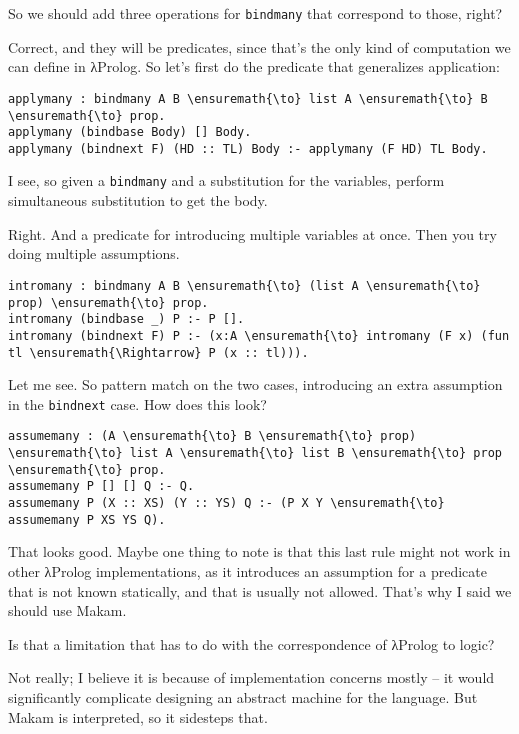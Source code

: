 \heroSTUDENT{} So we should add three operations for \texttt{bindmany} that
correspond to those, right?

\heroADVISOR{} Correct, and they will be predicates, since that's the only
kind of computation we can define in \foreignlanguage{greek}{λ}Prolog. So let's first do the
predicate that generalizes application:

\begin{verbatim}
applymany : bindmany A B \ensuremath{\to} list A \ensuremath{\to} B \ensuremath{\to} prop.
applymany (bindbase Body) [] Body.
applymany (bindnext F) (HD :: TL) Body :- applymany (F HD) TL Body.
\end{verbatim}

\heroSTUDENT{} I see, so given a \texttt{bindmany} and a substitution for the
variables, perform simultaneous substitution to get the body.

\heroADVISOR{} Right. And a predicate for introducing multiple variables at
once. Then you try doing multiple assumptions.

\begin{verbatim}
intromany : bindmany A B \ensuremath{\to} (list A \ensuremath{\to} prop) \ensuremath{\to} prop.
intromany (bindbase _) P :- P [].
intromany (bindnext F) P :- (x:A \ensuremath{\to} intromany (F x) (fun tl \ensuremath{\Rightarrow} P (x :: tl))).
\end{verbatim}

\heroSTUDENT{} Let me see. So pattern match on the two cases, introducing an
extra assumption in the \texttt{bindnext} case. How does this look?

\begin{verbatim}
assumemany : (A \ensuremath{\to} B \ensuremath{\to} prop) \ensuremath{\to} list A \ensuremath{\to} list B \ensuremath{\to} prop \ensuremath{\to} prop.
assumemany P [] [] Q :- Q.
assumemany P (X :: XS) (Y :: YS) Q :- (P X Y \ensuremath{\to} assumemany P XS YS Q).
\end{verbatim}

\heroADVISOR{} That looks good. Maybe one thing to note is that this last rule
might not work in other \foreignlanguage{greek}{λ}Prolog implementations, as it introduces an
assumption for a predicate that is not known statically, and that is
usually not allowed. That's why I said we should use Makam.

\heroSTUDENT{} Is that a limitation that has to do with the correspondence of
\foreignlanguage{greek}{λ}Prolog to logic?

\heroADVISOR{} Not really; I believe it is because of implementation concerns
mostly -- it would significantly complicate designing an abstract
machine for the language. But Makam is interpreted, so it sidesteps
that.

